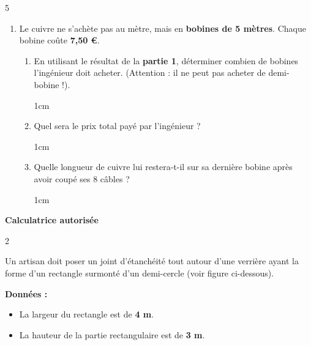 \documentclass[a4paper]{book}
\begin{document}
{\begin{exerciceNote}{5}
\begin{enumerate}[leftmargin=*]
            Quelle masse de métal reste-t-il sous forme de chutes ?

            \begin{ZoneReponse}{2cm}
            \end{ZoneReponse}

            \item Le cuivre ne s'achète pas au mètre, mais en \textbf{bobines de 5 mètres}. Chaque bobine coûte \textbf{7,50 €}.
            \begin{enumerate}[leftmargin=*]
                \item En utilisant le résultat de la \textbf{partie 1}, déterminer combien de bobines l'ingénieur doit acheter. (Attention : il ne peut pas acheter de demi-bobine !).
                
                \begin{ZoneReponse}{1cm}
                \end{ZoneReponse}
                
                \item Quel sera le prix total payé par l'ingénieur ?

                \begin{ZoneReponse}{1cm}
                \end{ZoneReponse}
                
                \item Quelle longueur de cuivre lui restera-t-il sur sa dernière bobine après avoir coupé ses 8 câbles ?

                \begin{ZoneReponse}{1cm}
                \end{ZoneReponse}
            \end{enumerate}
        \end{enumerate}
    \end{exerciceNote}

\newpage

\raggedright
\NomPrenom  \hfill \textbf{Calculatrice autorisée}


    \begin{exerciceNote}{2}
        \begin{minipage}{0.6\linewidth}
            Un artisan doit poser un joint d'étanchéité tout autour d'une verrière ayant la forme d'un rectangle surmonté d'un demi-cercle (voir figure ci-dessous).
        
            \textbf{Données :}
            \begin{itemize}
                \item La largeur du rectangle est de \textbf{4 m}.
                \item La hauteur de la partie rectangulaire est de \textbf{3 m}.
            \end{itemize}
        

\end{minipage}
\end{exerciceNote}}
\end{document}
